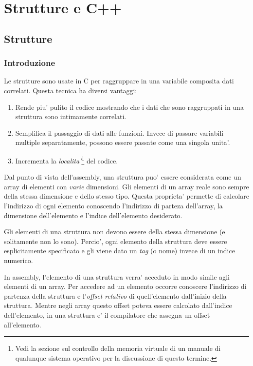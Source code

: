 \chapter{Strutture e C++}

\section{Strutture}

\subsection{Introduzione}

Le strutture sono usate in C per raggruppare in una variabile composita
dati correlati. Questa tecnica ha diversi vantaggi:
\begin{enumerate}
\item Rende piu' pulito il codice mostrando che i dati che sono raggruppati in
      una struttura sono intimamente correlati.
\item Semplifica il passaggio di dati alle funzioni. Invece di passare variabili
      multiple separatamente, possono essere passate come una singola unita'.
\item Incrementa la \emph{localita'}\footnote{Vedi la sezione sul controllo
 della memoria virtuale di un manuale di qualunque sistema operativo per la discussione di
questo termine.} del codice.
\end{enumerate}

Dal punto di vista dell'assembly, una struttura puo' essere considerata
come un array di elementi con \emph{varie} dimensioni. Gli elementi di
un array reale sono sempre della stessa dimensione e dello stesso tipo.
Questa proprieta' permette di calcolare l'indirizzo di ogni elemento
conoscendo l'indirizzo di parteza dell'array, la dimensione dell'elemento
e l'indice dell'elemento desiderato.

Gli elementi di una struttura non devono essere della stessa dimensione (e 
solitamente non lo sono). Percio', ogni elemento della struttura 
deve essere esplicitamente specificato e gli viene dato un \emph{tag} 
(o nome) invece di un indice numerico. 

In assembly, l'elemento di una struttura verra' acceduto in modo simile
agli elementi di un array. Per accedere ad un elemento occorre conoscere
l'indirizzo di partenza della struttura e l'\emph{offset relativo} di
quell'elemento dall'inizio della struttura. Mentre negli array questo offset
poteva essere calcolato dall'indice dell'elemento, in una struttura 
e' il compilatore che assegna un offset all'elemento.

